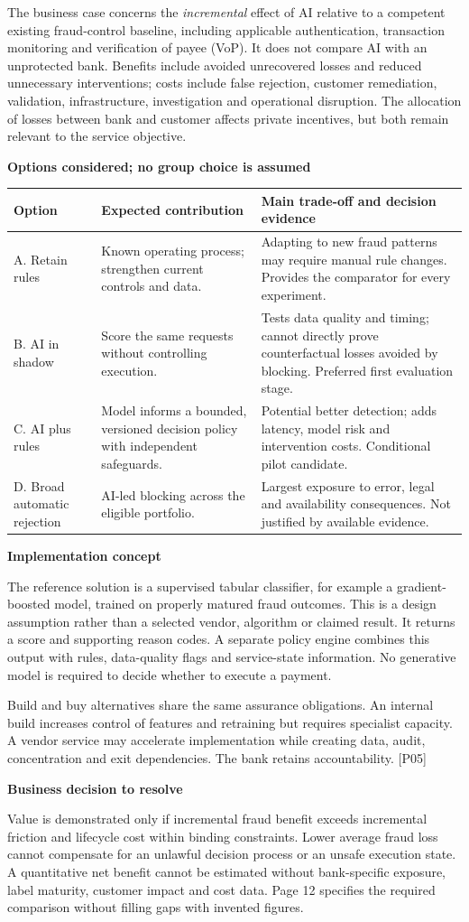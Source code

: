 \documentclass[11pt,a4paper]{article}
\newcommand{\sub}[1]{\par\vspace{2mm}\textbf{\color{ink}#1}\par}
\newcommand{\src}[1]{{\small[#1]}}
\begin{document}
The business case concerns the \emph{incremental} effect of AI relative to a competent existing fraud-control baseline, including applicable authentication, transaction monitoring and verification of payee (VoP). It does not compare AI with an unprotected bank. Benefits include avoided unrecovered losses and reduced unnecessary interventions; costs include false rejection, customer remediation, validation, infrastructure, investigation and operational disruption. The allocation of losses between bank and customer affects private incentives, but both remain relevant to the service objective.
\sub{Options considered; no group choice is assumed}
\par{\small\begin{tabularx}{\textwidth}{@{}P{25mm}YY@{}}\toprule
Option & Expected contribution & Main trade-off and decision evidence\\\midrule
A. Retain rules & Known operating process; strengthen current controls and data. & Adapting to new fraud patterns may require manual rule changes. Provides the comparator for every experiment.\\
B. AI in shadow & Score the same requests without controlling execution. & Tests data quality and timing; cannot directly prove counterfactual losses avoided by blocking. Preferred first evaluation stage.\\
C. AI plus rules & Model informs a bounded, versioned decision policy with independent safeguards. & Potential better detection; adds latency, model risk and intervention costs. Conditional pilot candidate.\\
D. Broad automatic rejection & AI-led blocking across the eligible portfolio. & Largest exposure to error, legal and availability consequences. Not justified by available evidence.\\\bottomrule
\end{tabularx}\par}
\sub{Implementation concept}
The reference solution is a supervised tabular classifier, for example a gradient-boosted model, trained on properly matured fraud outcomes. This is a design assumption rather than a selected vendor, algorithm or claimed result. It returns a score and supporting reason codes. A separate policy engine combines this output with rules, data-quality flags and service-state information. No generative model is required to decide whether to execute a payment.

Build and buy alternatives share the same assurance obligations. An internal build increases control of features and retraining but requires specialist capacity. A vendor service may accelerate implementation while creating data, audit, concentration and exit dependencies. The bank retains accountability. \src{P05}
\sub{Business decision to resolve}
Value is demonstrated only if incremental fraud benefit exceeds incremental friction and lifecycle cost within binding constraints. Lower average fraud loss cannot compensate for an unlawful decision process or an unsafe execution state. A quantitative net benefit cannot be estimated without bank-specific exposure, label maturity, customer impact and cost data. Page 12 specifies the required comparison without filling gaps with invented figures.
\end{document}
